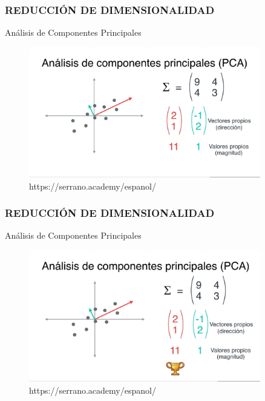 \documentclass{beamer}
\begin{document}
\begin{frame}
	\frametitle{REDUCCIÓN DE DIMENSIONALIDAD}
	\begin{block}{Análisis de Componentes Principales}	
		\begin{figure}
			\includegraphics[width=0.9\textwidth]{PCA/IMG_3583.jpg}
			\caption{https://serrano.academy/espanol/}
		\end{figure}
	\end{block}
\end{frame}

\begin{frame}
	\frametitle{REDUCCIÓN DE DIMENSIONALIDAD}
	\begin{block}{Análisis de Componentes Principales}	
		\begin{figure}
			\includegraphics[width=0.9\textwidth]{PCA/IMG_3584.jpg}
			\caption{https://serrano.academy/espanol/}
		\end{figure}
	\end{block}
\end{frame}
\end{document}
